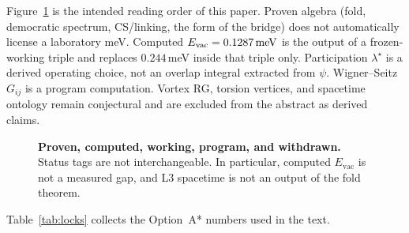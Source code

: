 \documentclass[11pt,letterpaper]{article}
\begin{document}
Figure~\ref{fig:status} is the intended reading order of this paper. Proven algebra (fold, democratic spectrum, CS/linking, the form of the bridge) does not automatically license a laboratory meV. Computed $E_{\mathrm{vac}}=0.1287\,\mathrm{meV}$ is the output of a frozen-working triple and replaces $0.244$\,meV inside that triple only. Participation $\lambda^\star$ is a derived operating choice, not an overlap integral extracted from $\psi$. Wigner--Seitz $G_{ij}$ is a program computation. Vortex RG, torsion vertices, and \TDVT{} spacetime ontology remain conjectural and are excluded from the abstract as derived claims.

\begin{figure}[H]
\centering

\caption{\textbf{Proven, computed, working, program, and withdrawn.} Status tags are not interchangeable. In particular, computed $E_{\mathrm{vac}}$ is not a measured gap, and L3 spacetime is not an output of the fold theorem.}
\label{fig:status}
\end{figure}

Table~\ref{tab:locks} collects the Option~A* numbers used in the text.
\end{document}
